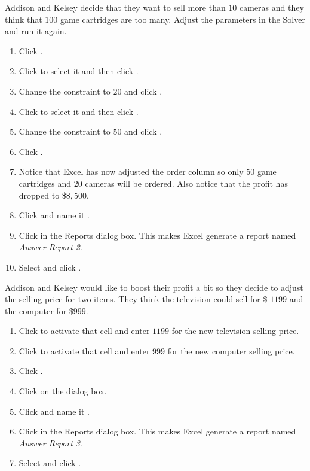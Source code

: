 Addison and Kelsey decide that they want to sell more than $ 10 $ cameras and they think that $ 100 $ game cartridges are too many. Adjust the parameters in the Solver and run it again.

\begin{enumerate}
	\item Click .
	\item Click  to select it and then click .
	\item Change the constraint to $ 20 $ and click .
	\item Click  to select it and then click .
	\item Change the constraint to $ 50 $ and click .
	\item Click .
	\item Notice that Excel has now adjusted the order column so only $ 50 $ game cartridges and $ 20 $ cameras will be ordered. Also notice that the profit has dropped to \$$ 8,500 $. 
	\item Click  and name it .
	\item Click  in the Reports dialog box. This makes Excel generate a report named \textit{Answer Report 2}.
	\item Select  and click .
\end{enumerate}

Addison and Kelsey would like to boost their profit a bit so they decide to adjust the selling price for two items. They think the television could sell for \$ $ 1199 $ and the computer for \$$ 999 $. 

\begin{enumerate}
	\item Click  to activate that cell and enter $ 1199 $ for the new television selling price.
	\item Click  to activate that cell and enter $ 999 $ for the new computer selling price.
	\item Click .
	\item Click  on the  dialog box.
	\item Click  and name it .
	\item Click  in the Reports dialog box. This makes Excel generate a report named \textit{Answer Report 3}.
	\item Select  and click .
\end{enumerate}

